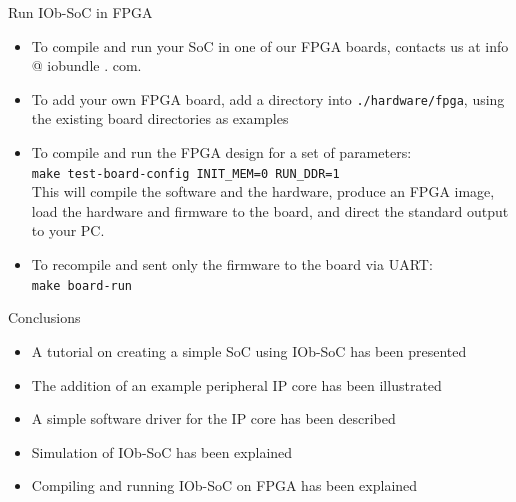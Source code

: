 \documentclass [xcolor=svgnames, t] {beamer}
\begin{document}
\begin{frame}{Run IOb-SoC in FPGA}
\begin{itemize}
\item To compile and run your SoC in one of our FPGA boards, contacts us at info
  @ iobundle . com.
\item To add your own FPGA board, add a directory into {\tt ./hardware/fpga},
  using the existing board directories as examples
\item To compile and run the FPGA design for a set of parameters:\\
  {\tt make test-board-config INIT\_MEM=0 RUN\_DDR=1}\\
  This will compile the software and the hardware, produce an FPGA image, load the hardware and firmware to the board, and direct the standard output to your PC.
\item To recompile and sent only the firmware to the board via UART:\\
  {\tt make board-run}
\end{itemize}
\end{frame}

\begin{frame}{Conclusions}  
  \begin{itemize}
  \item A tutorial on creating a simple SoC using IOb-SoC has been presented
  \item The addition of an example peripheral IP core has been illustrated
  \item A simple software driver for the IP core has been described
  \item Simulation of IOb-SoC has been explained
  \item Compiling and running IOb-SoC on FPGA has been explained
  \end{itemize}
\end{frame}

\end{document}

